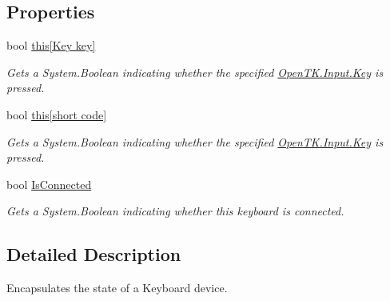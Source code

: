 \subsection*{Properties}
\begin{DoxyCompactItemize}
\item 
bool \hyperlink{struct_open_t_k_1_1_input_1_1_keyboard_state_a407bff9cc22f30a385a9c0dc17fb81a4}{this\mbox{[}\-Key key\mbox{]}}
\begin{DoxyCompactList}\small\item\em Gets a System.\-Boolean indicating whether the specified \hyperlink{namespace_open_t_k_1_1_input_a30415d20dcc907a84693777cc0bdf1c7}{Open\-T\-K.\-Input.\-Key} is pressed. \end{DoxyCompactList}\item 
bool \hyperlink{struct_open_t_k_1_1_input_1_1_keyboard_state_ab91b7bdd0c271b1b95ee3f22bee72320}{this\mbox{[}short code\mbox{]}}
\begin{DoxyCompactList}\small\item\em Gets a System.\-Boolean indicating whether the specified \hyperlink{namespace_open_t_k_1_1_input_a30415d20dcc907a84693777cc0bdf1c7}{Open\-T\-K.\-Input.\-Key} is pressed. \end{DoxyCompactList}\item 
bool \hyperlink{struct_open_t_k_1_1_input_1_1_keyboard_state_a4b3faa1844c0b779665cc3fb42148bb4}{Is\-Connected}
\begin{DoxyCompactList}\small\item\em Gets a System.\-Boolean indicating whether this keyboard is connected. \end{DoxyCompactList}\end{DoxyCompactItemize}


\subsection{Detailed Description}
Encapsulates the state of a Keyboard device. 



